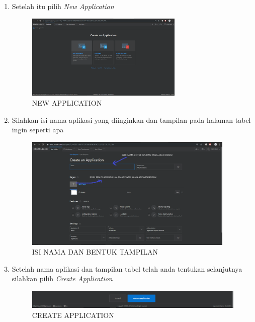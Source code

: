 \documentclass[a4paper, 12pt]{article}
\begin{document}
\begin{enumerate}
\item Setelah itu pilih \textit{New Application}
\begin{figure}[h]
\begin{center}
\includegraphics[width=7.5cm]{figure/NA.png}
\caption{NEW APPLICATION}
\end{center}
\end{figure}

\item Silahkan isi nama aplikasi yang diinginkan dan tampilan pada halaman tabel ingin seperti apa
\begin{figure}[h]
\begin{center}
\includegraphics[width=10cm]{figure/CA1.png}
\caption{ISI NAMA DAN BENTUK TAMPILAN}
\end{center}
\end{figure}

\item Setelah nama aplikasi dan tampilan tabel telah anda tentukan selanjutnya silahkan pilih \textit{Create Application}
\begin{figure}[h]
\begin{center}
\includegraphics[width=12.5cm]{figure/CA2.png}
\caption{CREATE APPLICATION}
\end{center}
\end{figure}


\end{enumerate}
\end{document}
